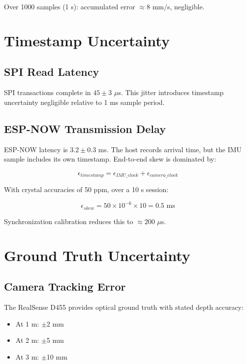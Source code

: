 Over 1000 samples (1 s): accumulated error $\approx 8$ mm/s, negligible.

\section{Timestamp Uncertainty}

\subsection{SPI Read Latency}

SPI transactions complete in $45 \pm 3$ $\mu$s. This jitter introduces timestamp uncertainty negligible relative to 1 ms sample period.

\subsection{ESP-NOW Transmission Delay}

ESP-NOW latency is $3.2 \pm 0.3$ ms. The host records arrival time, but the IMU sample includes its own timestamp. End-to-end skew is dominated by:

\begin{equation}
    \epsilon_{timestamp} = \epsilon_{IMU\_clock} + \epsilon_{camera\_clock}
\end{equation}

With crystal accuracies of 50 ppm, over a 10 s session:

\begin{equation}
    \epsilon_{skew} = 50 \times 10^{-6} \times 10 = 0.5 \text{ ms}
\end{equation}

Synchronization calibration reduces this to $\approx 200$ $\mu$s.

\section{Ground Truth Uncertainty}

\subsection{Camera Tracking Error}

The RealSense D455 provides optical ground truth with stated depth accuracy:

\begin{itemize}
    \item At 1 m: $\pm$2 mm
    \item At 2 m: $\pm$5 mm
    \item At 3 m: $\pm$10 mm
\end{itemize}

